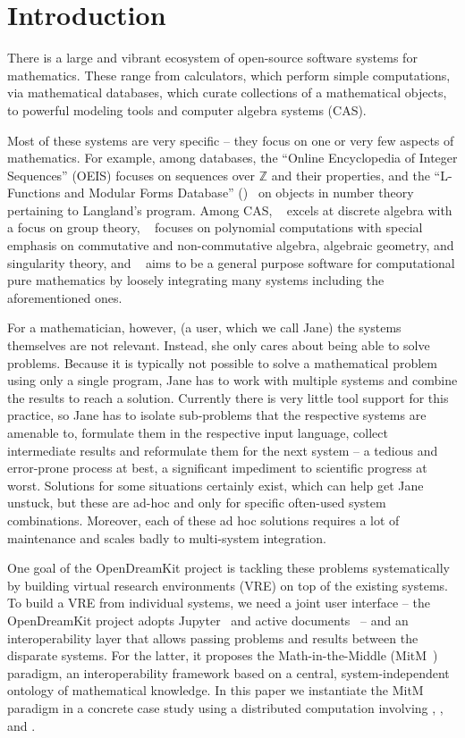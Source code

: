 \section{Introduction}\label{sec:intro}

There is a large and vibrant ecosystem of open-source software systems for mathematics. 
These range from calculators, which perform simple computations, via mathematical databases, which curate collections of a mathematical objects, to powerful modeling tools and computer algebra systems (CAS).

Most of these systems are very specific -- they focus on one or very few aspects of mathematics.
For example, among databases, the ``Online Encyclopedia of Integer Sequences'' (OEIS) focuses on sequences over $\mathbb{Z}$ and their properties, and the ``L-Functions and Modular Forms
Database'' (\LMFDB)~\cite{Cremona:LMFDB16,lmfdb:on} on objects in number theory pertaining to Langland's program.
 Among CAS, \GAP~\cite{GAP:on} excels at discrete algebra with a focus on group theory, \Singular~\cite{singular:on} focuses on polynomial computations with special emphasis on commutative and non-commutative algebra, algebraic geometry, and singularity theory, and \Sage~\cite{SageMath:on} aims to be a general purpose software for computational pure mathematics by loosely integrating many systems including the aforementioned ones.

For a mathematician, however, (a user, which we call Jane) the systems themselves are not relevant.
Instead, she only cares about being able to solve problems. 
Because it is typically not possible to solve a mathematical problem using only a single program, Jane has to work with multiple systems and combine the results to reach a solution. 
Currently there is very little tool support for this practice, so Jane has to isolate sub-problems that the respective systems are amenable to, formulate them in the respective input language, collect intermediate results and reformulate them for the next system -- a tedious and error-prone process at best, a significant impediment to scientific progress at worst.
Solutions for some situations certainly exist, which can help get Jane unstuck, but these are ad-hoc and only for specific often-used system combinations. 
Moreover, each of these ad hoc solutions requires a lot of maintenance and scales badly to multi-system integration. 

One goal of the OpenDreamKit project is tackling these problems systematically by building virtual research environments (VRE) on top of the existing systems.
To build a VRE from individual systems, we need a joint user interface -- the OpenDreamKit project adopts Jupyter~\cite{jupyter-project:on} and active documents~\cite{KohDavGin:psewads11} -- and an interoperability layer that allows passing problems and results between the disparate systems. 
For the latter, it proposes the Math-in-the-Middle (MitM~\cite{DehKohKon:iop16}) paradigm, an interoperability framework based on a central, system-independent ontology of mathematical knowledge.
In this paper we instantiate the MitM paradigm in a concrete case study using a distributed computation involving \GAP, \Sage, and \Singular.

